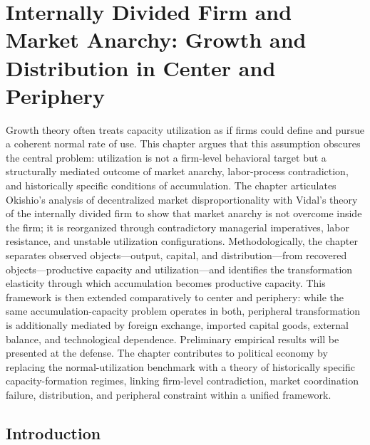 
\chapter{Internally Divided Firm and Market Anarchy: Growth and Distribution in Center and Periphery}
\begin{chapterabstract}
Growth theory often treats capacity utilization as if firms could
define and pursue a coherent normal rate of use. This chapter argues that this
assumption obscures the central problem: utilization is not a firm-level
behavioral target but a structurally mediated outcome of market anarchy,
labor-process contradiction, and historically specific conditions of
accumulation. The chapter articulates Okishio's analysis of decentralized
market disproportionality with Vidal's theory of the internally divided firm to
show that market anarchy is not overcome inside the firm; it is reorganized
through contradictory managerial imperatives, labor resistance, and unstable
utilization configurations. Methodologically, the chapter separates observed
objects---output, capital, and distribution---from recovered objects---productive
capacity and utilization---and identifies the transformation elasticity through
which accumulation becomes productive capacity. This framework is then extended
comparatively to center and periphery: while the same accumulation-capacity
problem operates in both, peripheral transformation is additionally mediated by
foreign exchange, imported capital goods, external balance, and technological
dependence. Preliminary empirical results will be presented at the defense. The
chapter contributes to political economy by replacing the normal-utilization
benchmark with a theory of historically specific capacity-formation regimes,
linking firm-level contradiction, market coordination failure, distribution,
and peripheral constraint within a unified framework.
\end{chapterabstract}

\pagebreak


\section{Introduction}

